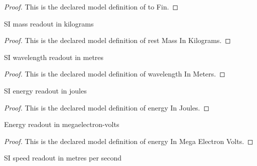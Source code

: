 \begin{proof}
  This is the declared model definition of to Fin.
\end{proof}
\begin{definition}
  \label{def:physics:phyx-mini-0613:phyxminiproblems-problemphyxmini0613-restmassinkilograms}
  SI mass readout in kilograms
\end{definition}
\begin{proof}
  This is the declared model definition of rest Mass In Kilograms.
\end{proof}
\begin{definition}
  \label{def:physics:phyx-mini-0613:phyxminiproblems-problemphyxmini0613-wavelengthinmeters}
  SI wavelength readout in metres
\end{definition}
\begin{proof}
  This is the declared model definition of wavelength In Meters.
\end{proof}
\begin{definition}
  \label{def:physics:phyx-mini-0613:phyxminiproblems-problemphyxmini0613-energyinjoules}
  SI energy readout in joules
\end{definition}
\begin{proof}
  This is the declared model definition of energy In Joules.
\end{proof}
\begin{definition}
  \label{def:physics:phyx-mini-0613:phyxminiproblems-problemphyxmini0613-energyinmegaelectronvolts}
  Energy readout in megaelectron-volts
\end{definition}
\begin{proof}
  This is the declared model definition of energy In Mega Electron Volts.
\end{proof}
\begin{definition}
  \label{def:physics:phyx-mini-0613:phyxminiproblems-problemphyxmini0613-speedinmeterspersecond}
  SI speed readout in metres per second
\end{definition}
